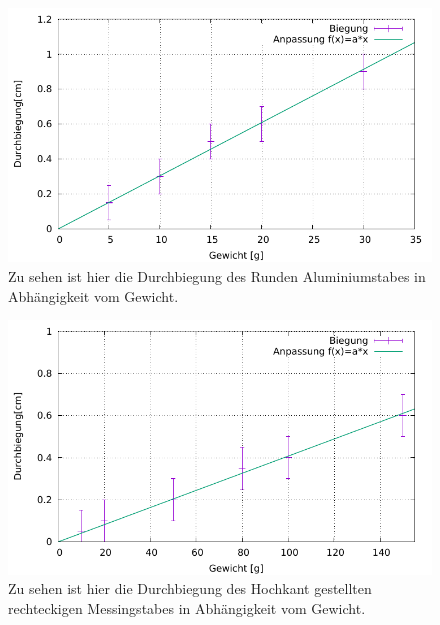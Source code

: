 \begin{figure}[h]
	\centering
	\includegraphics[width=1\textwidth]{res/DurchbiegungAlu.pdf}
	\caption{Zu sehen ist hier die Durchbiegung des Runden Aluminiumstabes in Abhängigkeit vom Gewicht.}
	\label{fig:durchbiegungalu}
\end{figure}

\begin{figure}[h]
	\centering
	\includegraphics[width=1\textwidth]{res/DurchbiegungMessingHochkant.pdf}
	\caption{Zu sehen ist hier die Durchbiegung des Hochkant gestellten rechteckigen Messingstabes in Abhängigkeit vom Gewicht.}
	\label{fig:durchbiegungMessHoch}
\end{figure}

